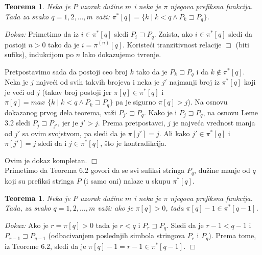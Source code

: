 \documentclass[a4paper,12pt]{article}
\newtheorem{thm}[dfn]{Teorema}
\begin{document}
\begin{thm}

Neka je $P$ uzorak du\v zine $m$ i neka je $\pi$ njegova prefiksna funkcija. Tada za svako $q = 1, 2, \ldots, m$ va\v zi: $ \pi^\ast[q] = \{k \mid k < q \wedge P_k \sqsupset P_q\}$.

\end{thm}
\textit{Dokaz:} Primetimo da iz $i \in \pi^\ast[q]$ sledi $P_i \sqsupset P_q$. Zaista, ako $i \in \pi^\ast[q]$ sledi da postoji $n > 0$ tako da je $i = \pi^{(n)}[q]$. Koriste\' ci tranzitivnost relacije $\sqsupset$ (biti sufiks), indukcijom po $n$ lako dokazujemo tvr\dj enje.

Pretpostavimo sada da postoji ceo broj $k$ tako da je $P_k \sqsupset P_q$ i da $k \not\in  \pi^\ast[q]$. Neka je $j$ najve\' ci od svih takvih brojeva i neka je $j'$ najmanji broj iz $\pi^\ast[q]$ koji je ve\' ci od $j$ (takav broj postoji jer $\pi[q] \in \pi^\ast[q]$ i $\pi[q] = max\phantom{i}\{k \mid k < q \wedge P_k \sqsupset P_q\}$ pa je sigurno $\pi[q] > j$). Na osnovu dokazanog prvog dela teorema, va\v zi $P_{j'} \sqsupset P_q$. Kako je i $P_j \sqsupset P_q$, na osnovu Leme 3.2 sledi $P_j \sqsupset P_{j'}$, jer je $j' > j$. Prema pretpostavci, $j$ je najve\' ca vrednost manja od $j'$ sa ovim svojstvom, pa sledi da je $\pi[j'] = j$. Ali kako $j' \in \pi^\ast[q]$ i $\pi[j'] = j$ sledi da i $j \in \pi^\ast[q]$, \v sto je kontradikcija.

Ovim je dokaz kompletan. $\Box$
\\

Primetimo da Teorema 6.2 govori da se svi sufiksi stringa $P_q$, du\v zine manje od $q$ koji su prefiksi stringa $P$ (i samo oni) nalaze u skupu $\pi^\ast[q]$.

\begin{thm}

Neka je $P$ uzorak du\v zine $m$ i neka je $\pi$ njegova prefiksna funkcija. Tada, za svako $q = 1, 2, \ldots, m$ va\v zi: ako je $\pi[q] > 0$, tada $\pi[q] - 1 \in \pi^\ast[q - 1]$.

\end{thm}
\textit{Dokaz:} Ako je $r = \pi[q] > 0$ tada je $r < q$ i $P_r \sqsupset P_q$. Sledi da je $r - 1 < q - 1$ i $P_{r - 1} \sqsupset P_{q - 1}$ (odbacivanjem poslednjih simbola stringova $P_r$ i $P_q$). Prema tome, iz Teoreme 6.2, sledi da je $\pi[q] - 1 = r - 1 \in \pi^\ast[q - 1]$. $\Box$
\\
\end{document}

